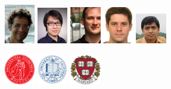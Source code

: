 \begin{frame}
  \includegraphics[width=0.1\textwidth]{../figures/me-recent} \hspace{1em}
  \includegraphics[width=0.1\textwidth]{../figures/yang} \hspace{1em}
  \includegraphics[width=0.1\textwidth]{../figures/parkes} \hspace{1em}
  \includegraphics[width=0.1\textwidth]{../figures/goran} \hspace{1em}
  \includegraphics[width=0.1\textwidth]{../figures/deb} 
  \begin{center}
    \includegraphics[width=0.1\textwidth]{../figures/oslo}
    \hspace{1em}
    \includegraphics[width=0.1\textwidth]{../figures/ucsc}
    \hspace{1em}
    \hspace{0.1\textwidth}
    \hspace{1em}
    \includegraphics[width=0.1\textwidth]{../figures/harvard}
    \hspace{1em}
    \hspace{0.1\textwidth}
  \end{center}
  

\end{frame}
